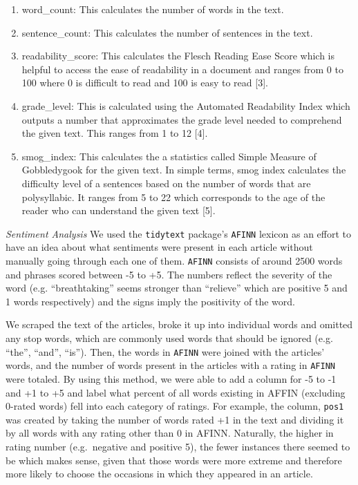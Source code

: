 \documentclass[10pt,letterpaper]{article}
\providecommand{\tightlist}{%
  \setlength{\itemsep}{0pt}\setlength{\parskip}{0pt}}
\begin{document}
\begin{enumerate}
\def\labelenumi{\arabic{enumi}.}
\tightlist
\item
  word\_count: This calculates the number of words in the text.
\item
  sentence\_count: This calculates the number of sentences in the text.
\item
  readability\_score: This calculates the Flesch Reading Ease Score
  which is helpful to access the ease of readability in a document and
  ranges from 0 to 100 where 0 is difficult to read and 100 is easy to
  read {[}3{]}.
\item
  grade\_level: This is calculated using the Automated Readability Index
  which outputs a number that approximates the grade level needed to
  comprehend the given text. This ranges from 1 to 12 {[}4{]}.
\item
  smog\_index: This calculates the a statistics called Simple Measure of
  Gobbledygook for the given text. In simple terms, smog index
  calculates the difficulty level of a sentences based on the number of
  words that are polysyllabic. It ranges from 5 to 22 which corresponds
  to the age of the reader who can understand the given text {[}5{]}.
\end{enumerate}

\emph{Sentiment Analysis} We used the \texttt{tidytext} package's
\texttt{AFINN} lexicon as an effort to have an idea about what
sentiments were present in each article without manually going through
each one of them. \texttt{AFINN} consists of around 2500 words and
phrases scored between -5 to +5. The numbers reflect the severity of the
word (e.g. ``breathtaking'' seems stronger than ``relieve'' which are
positive 5 and 1 words respectively) and the signs imply the positivity
of the word.

We scraped the text of the articles, broke it up into individual words
and omitted any stop words, which are commonly used words that should be
ignored (e.g. ``the'', ``and'', ``is''). Then, the words in
\texttt{AFINN} were joined with the articles' words, and the number of
words present in the articles with a rating in \texttt{AFINN} were
totaled. By using this method, we were able to add a column for -5 to -1
and +1 to +5 and label what percent of all words existing in AFFIN
(excluding 0-rated words) fell into each category of ratings. For
example, the column, \texttt{pos1} was created by taking the number of
words rated +1 in the text and dividing it by all words with any rating
other than 0 in AFINN. Naturally, the higher in rating number
(e.g.~negative and positive 5), the fewer instances there seemed to be
which makes sense, given that those words were more extreme and
therefore more likely to choose the occasions in which they appeared in
an article.
\end{document}
